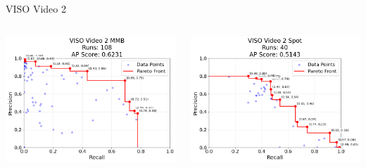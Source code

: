 \begin{frame}{VISO Video 2}
    \begin{columns}
        \begin{column}{0.48\textwidth}
            \centering
            \includegraphics[width=\textwidth,height=0.7\textheight,keepaspectratio]{images/bom/VISO_Video_2_MMB_108.png}
        \end{column}
        \begin{column}{0.48\textwidth}
            \centering
            \includegraphics[width=\textwidth,height=0.7\textheight,keepaspectratio]{images/bom/VISO_Video_2_Spot_40.png}
        \end{column}
    \end{columns}
\end{frame}

